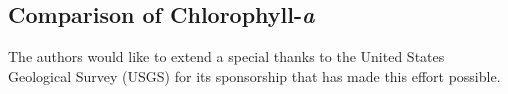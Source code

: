 \documentclass[]{spie}  %
\begin{document}
\subsection{Comparison of Chlorophyll-{\it a}}
\acknowledgments     %
The authors would like to extend a special thanks to the United States Geological Survey (USGS) for its sponsorship that has made this effort possible.

   
\end{document}
